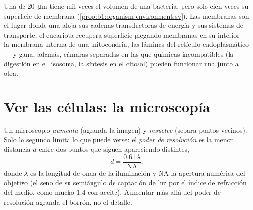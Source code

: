 \begin{example}\label{ex:b1:cell-unit-of-life:whycompart}
Una  de \qty{20}{\micro m} tiene mil veces el volumen de una bacteria,
pero solo cien veces su superficie de membrana
(\cref{prop:b1:organism-environment:sv}). Las membranas son el lugar donde
una  aloja sus cadenas transductoras de energía y sus sistemas de
transporte; el eucariota recupera superficie plegando membranas en su
interior --- la membrana interna de una mitocondria, las láminas del
retículo endoplasmático --- y gana, además, cámaras separadas en las que
químicas incompatibles (la digestión en el lisosoma, la síntesis en el
citosol) pueden funcionar una junto a otra.
\end{example}

\section{Ver las células: la microscopía}

\begin{definition}\label{def:b1:cell-unit-of-life:resolution}
Un microscopio \emph{aumenta} (agranda la imagen) y
\emph{resuelve} (separa puntos vecinos). Solo lo segundo
limita lo que puede verse: el \emph{poder de
resolución} es la menor distancia $d$ entre dos
puntos que siguen apareciendo distintos,
\[
d = \frac{0.61\,\lambda}{\mathrm{NA}},
\]
donde $\lambda$ es la longitud de onda de la iluminación y $\mathrm{NA}$ la
apertura numérica del objetivo (el seno de su semiángulo de captación de luz
por el índice de refracción del medio, como mucho $1.4$ con aceite). Aumentar
más allá del poder de resolución agranda el borrón, no el detalle.
\end{definition}

